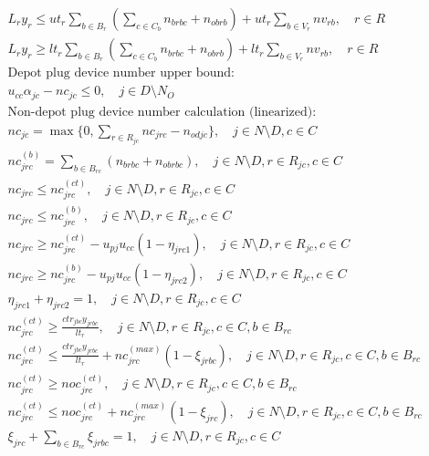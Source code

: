 \documentclass[10pt]{article}
\begin{document}
\begin{align*}
& L_r y_r \leq ut_r \sum_{b \in B_r} \left( \sum_{c \in C_b} n_{brbc} + n_{obrb} \right) + ut_r \sum_{b \in V_r} nv_{rb}, \quad r \in R \tag{28} \\
& L_r y_r \geq lt_r \sum_{b \in B_r} \left( \sum_{c \in C_b} n_{brbc} + n_{obrb} \right) + lt_r \sum_{b \in V_r} nv_{rb}, \quad r \in R \tag{29} \\
&\text{Depot plug device number upper bound:} \\
& u_{cc} \alpha_{jc} - nc_{jc} \leq 0, \quad j \in D \setminus N_O \tag{30} \\
&\text{Non-depot plug device number calculation (linearized):} \\
& nc_{jc} = \max\{0,\sum_{r \in R_{jc}} nc_{jrc} - n_{odjc}\}, \quad j \in N \setminus D, c \in C \tag{31} \\
& nc^{(b)}_{jrc} = \sum_{b \in B_{rc}}(n_{brbc} + n_{obrbc}), \quad j \in N \setminus D, r \in R_{jc}, c \in C \tag{32} \\
& nc_{jrc} \leq nc^{(ct)}_{jrc}, \quad j \in N \setminus D, r \in R_{jc}, c \in C \tag{33} \\
& nc_{jrc} \leq nc^{(b)}_{jrc}, \quad j \in N \setminus D, r \in R_{jc}, c \in C \tag{34} \\
& nc_{jrc} \geq nc^{(ct)}_{jrc} - u_{pj} u_{cc} (1 - \eta_{jrc1}), \quad j \in N \setminus D, r \in R_{jc}, c \in C \tag{35} \\
& nc_{jrc} \geq nc^{(b)}_{jrc} - u_{pj} u_{cc} (1 - \eta_{jrc2}), \quad j \in N \setminus D, r \in R_{jc}, c \in C \tag{36} \\
& \eta_{jrc1} + \eta_{jrc2} = 1, \quad j \in N \setminus D, r \in R_{jc}, c \in C \tag{37} \\
& nc^{(ct)}_{jrc} \geq \frac{ctr_{jbc} y_{jrbc}}{lt_r}, \quad j \in N \setminus D, r \in R_{jc}, c \in C, b \in B_{rc} \tag{38} \\
& nc^{(ct)}_{jrc} \leq \frac{ctr_{jbc} y_{jrbc}}{lt_r} + nc^{(max)}_{jrc} (1 - \xi_{jrbc}), \quad j \in N \setminus D, r \in R_{jc}, c \in C, b \in B_{rc} \tag{39} \\
& nc^{(ct)}_{jrc} \geq noc^{(ct)}_{jrc}, \quad j \in N \setminus D, r \in R_{jc}, c \in C, b \in B_{rc} \tag{40} \\
& nc^{(ct)}_{jrc} \leq noc^{(ct)}_{jrc} + nc^{(max)}_{jrc} (1 - \xi_{jrc}), \quad j \in N \setminus D, r \in R_{jc}, c \in C, b \in B_{rc} \tag{41} \\
& \xi_{jrc} + \sum_{b \in B_{rc}} \xi_{jrbc} = 1, \quad j \in N \setminus D, r \in R_{jc}, c \in C \tag{42} \\

\end{align*}
\end{document}
